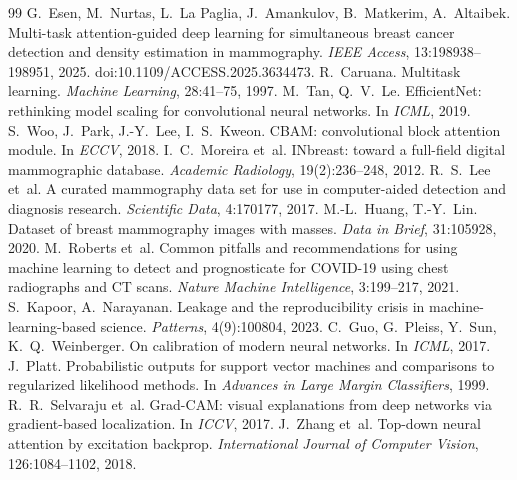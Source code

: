 \documentclass[10pt,a4paper]{article}
\begin{document}
\small
\begin{thebibliography}{99}
 G.~Esen, M.~Nurtas, L.~La Paglia, J.~Amankulov, B.~Matkerim, A.~Altaibek.
Multi-task attention-guided deep learning for simultaneous breast cancer detection and density estimation in
mammography. \emph{IEEE Access}, 13:198938--198951, 2025. doi:10.1109/ACCESS.2025.3634473.
 R.~Caruana. Multitask learning. \emph{Machine Learning}, 28:41--75, 1997.
 M.~Tan, Q.~V.~Le. EfficientNet: rethinking model scaling for convolutional neural
networks. In \emph{ICML}, 2019.
 S.~Woo, J.~Park, J.-Y.~Lee, I.~S.~Kweon. CBAM: convolutional block attention
module. In \emph{ECCV}, 2018.
 I.~C.~Moreira et~al. INbreast: toward a full-field digital mammographic
database. \emph{Academic Radiology}, 19(2):236--248, 2012.
 R.~S.~Lee et~al. A curated mammography data set for use in computer-aided detection
and diagnosis research. \emph{Scientific Data}, 4:170177, 2017.
 M.-L.~Huang, T.-Y.~Lin. Dataset of breast mammography images with masses.
\emph{Data in Brief}, 31:105928, 2020.
 M.~Roberts et~al. Common pitfalls and recommendations for using machine
learning to detect and prognosticate for COVID-19 using chest radiographs and CT scans. \emph{Nature Machine
Intelligence}, 3:199--217, 2021.
 S.~Kapoor, A.~Narayanan. Leakage and the reproducibility crisis in
machine-learning-based science. \emph{Patterns}, 4(9):100804, 2023.
 C.~Guo, G.~Pleiss, Y.~Sun, K.~Q.~Weinberger. On calibration of modern neural
networks. In \emph{ICML}, 2017.
 J.~Platt. Probabilistic outputs for support vector machines and comparisons to
regularized likelihood methods. In \emph{Advances in Large Margin Classifiers}, 1999.
 R.~R.~Selvaraju et~al. Grad-CAM: visual explanations from deep
networks via gradient-based localization. In \emph{ICCV}, 2017.
 J.~Zhang et~al. Top-down neural attention by excitation backprop.
\emph{International Journal of Computer Vision}, 126:1084--1102, 2018.
\end{thebibliography}
\end{document}
